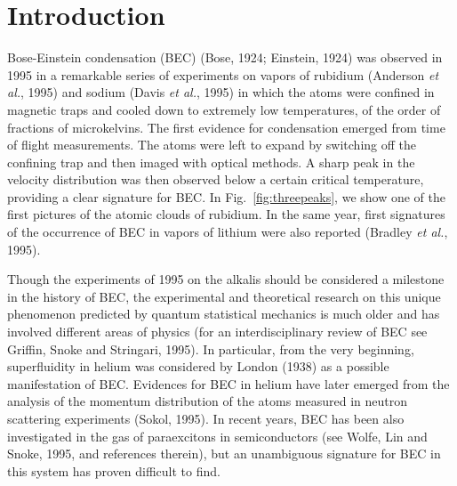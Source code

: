 



\section{Introduction}
\label{sec:intro}

Bose-Einstein condensation (BEC) (Bose, 1924; Einstein, 1924) was observed
in 1995 in a remarkable series of experiments on vapors of rubidium
(Anderson {\it et al.}, 1995) and sodium (Davis {\it et al.}, 1995) in
which the atoms were confined in magnetic traps and cooled down to extremely
low  temperatures, of the order of fractions of microkelvins.  The first
evidence for condensation emerged from time of flight measurements.
The atoms were left to expand by switching off the confining trap and then
imaged with optical methods.  A sharp peak in the velocity distribution
was then  observed  below a certain critical temperature, providing a clear
signature for BEC. In Fig.~\ref{fig:threepeaks}, we show one of the first
pictures of the atomic clouds of rubidium.  In the same year, first 
signatures of the occurrence of BEC in vapors of lithium were also 
reported (Bradley {\it et al.}, 1995). 

Though the experiments of 1995 on the alkalis should be considered a
milestone in the history of BEC,  the experimental and theoretical
research on this unique phenomenon predicted by quantum statistical
mechanics is much older and has  involved  different areas of physics
(for an interdisciplinary review of BEC see Griffin, Snoke and
Stringari, 1995). In particular, from the very beginning, superfluidity 
in helium was considered  by London (1938) as a possible manifestation 
of BEC.  Evidences for BEC in helium have later emerged from
the analysis of the momentum distribution of the atoms measured in 
neutron scattering experiments (Sokol, 1995). In recent years, BEC 
has been also investigated in the gas of paraexcitons in 
semiconductors (see Wolfe, Lin and Snoke, 1995, and references 
therein), but an unambiguous signature for BEC in this system has 
proven difficult to find. 

